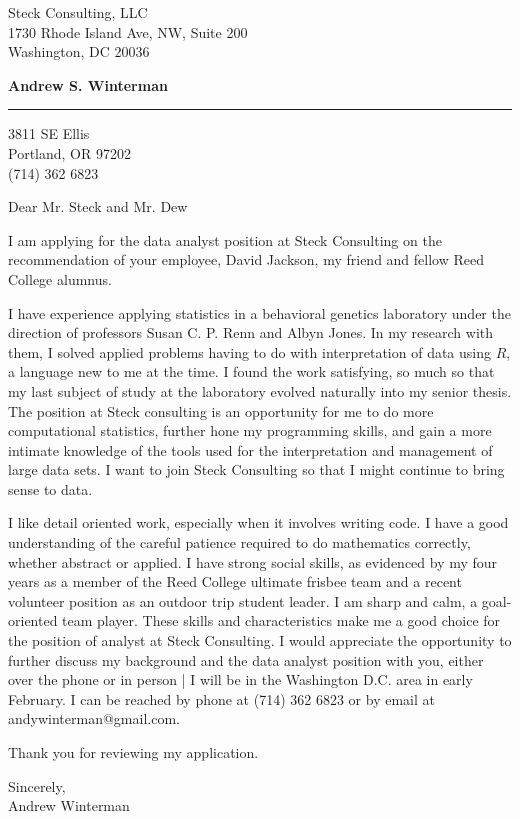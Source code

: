 \documentclass[11pt]{letter} %
\begin{document}
\longindentation=0pt                       %
\let\raggedleft\raggedright                %
 
\begin{letter}{
Steck Consulting, LLC \\
1730 Rhode Island Ave, NW, Suite 200 \\
Washington, DC 20036 \\ }

\begin{center}
\large \bf{Andrew S. Winterman} \end{center}
\medskip\hrule height 1pt
\begin{center}
3811 SE Ellis \\ Portland, OR 97202 \\ (714) 362 6823
\end{center}  



\opening{Dear Mr. Steck and  Mr. Dew} 
 
 I am applying for the data analyst position at Steck Consulting on the recommendation of  your employee, David Jackson, my friend and fellow Reed College alumnus.
 
I have experience applying statistics in a behavioral genetics laboratory under the direction of professors Susan C. P. Renn and Albyn Jones. In my research with them, I solved applied problems having to do with interpretation of data using $R$, a language new to me at the time. I found the work satisfying, so much so that my last subject of study at the laboratory evolved naturally into my senior thesis. The position at Steck consulting is an opportunity for me to do more computational statistics, further hone my programming skills, and gain a more intimate knowledge of the tools used for the interpretation and management of large data sets. I want to join Steck Consulting so that I might continue to bring sense to data. 
 
 I like detail oriented work, especially when it involves writing code. I have a good understanding of the careful patience required to do mathematics correctly, whether abstract or applied. I have strong social skills, as evidenced by my four years as a member of the Reed College ultimate frisbee team and a recent volunteer position as an outdoor trip student leader. I am sharp and calm, a goal-oriented team player. These skills and characteristics make me a good choice for the position of analyst at Steck Consulting. I would appreciate the opportunity to further discuss my background and the data analyst position with you, either over the phone or in person | I will be in the Washington D.C. area in early February.  I can be reached by phone at (714) 362 6823 or by email at andywinterman@gmail.com. 

Thank you for reviewing my application.

Sincerely, \\
Andrew Winterman

\end{letter}
 
\end{document}
